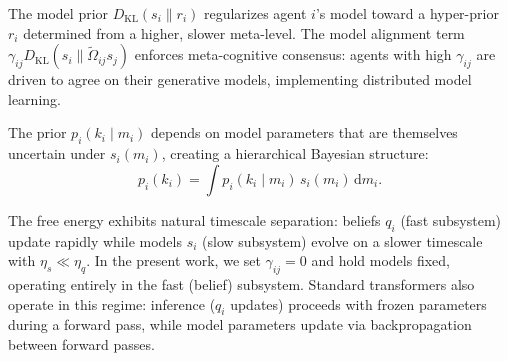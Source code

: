 \documentclass[twoside,11pt]{article}
\begin{document}
The model prior $D_{\mathrm{KL}}(s_i \| r_i)$ regularizes agent $i$'s model toward a hyper-prior $r_i$ determined from a higher, slower meta-level. The model alignment term $\gamma_{ij} D_{\mathrm{KL}}(s_i \| \tilde{\Omega}_{ij} s_j)$ enforces meta-cognitive consensus: agents with high $\gamma_{ij}$ are driven to agree on their generative models, implementing distributed model learning.

The prior $p_i(k_i \mid m_i)$ depends on model parameters that are themselves uncertain under $s_i(m_i)$, creating a hierarchical Bayesian structure:
\begin{equation}
p_i(k_i) = \int p_i(k_i \mid m_i) \, s_i(m_i) \, \mathrm{d}m_i.
\end{equation}

The free energy exhibits natural timescale separation: beliefs $q_i$ (fast subsystem) update rapidly while models $s_i$ (slow subsystem) evolve on a slower timescale with $\eta_s \ll \eta_q$. In the present work, we set $\gamma_{ij} = 0$ and hold models fixed, operating entirely in the fast (belief) subsystem. Standard transformers also operate in this regime: inference ($q_i$ updates) proceeds with frozen parameters during a forward pass, while model parameters update via backpropagation between forward passes.




\end{document}
